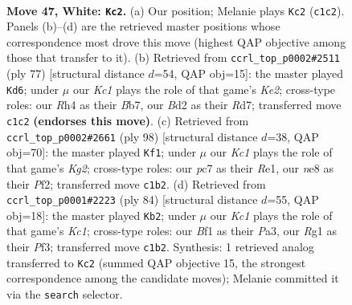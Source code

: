 \documentclass[11pt]{article}
\begin{document}
\clearpage

\begin{figure}[p]\centering
\begin{subfigure}{0.46\textwidth}\centering
\resizebox{\linewidth}{!}{%
\newchessgame
\chessboard[
  setfen={4n3/p1p5/2k2p2/8/r4P1R/8/3B3P/r1K2BR1 w - - 3 47},
  showmover=false,
  pgfstyle=straightmove, color=movearrow, markmove={c1-c2}
]}
\caption{}
\end{subfigure}\hfill
\begin{subfigure}{0.46\textwidth}\centering
\resizebox{\linewidth}{!}{%
\newchessgame
\chessboard[
  setfen={8/1b1rk2p/pp6/3p4/P4N2/1P1R2R1/2r2PP1/6K1 b - - 2 39},
  showmover=false,
  pgfstyle=straightmove, color=movearrow, markmove={e7-d6}
]}
\caption{}
\end{subfigure}
\\[4pt]
\begin{subfigure}{0.46\textwidth}\centering
\resizebox{\linewidth}{!}{%
\newchessgame
\chessboard[
  setfen={8/4k3/r2p4/P1pPn1p1/4B1r1/R7/5PK1/4R3 w - - 5 50},
  showmover=false,
  pgfstyle=straightmove, color=movearrow, markmove={g2-f1}
]}
\caption{}
\end{subfigure}\hfill
\begin{subfigure}{0.46\textwidth}\centering
\resizebox{\linewidth}{!}{%
\newchessgame
\chessboard[
  setfen={2r5/8/p3pk1P/1pr5/7R/P2B1P2/2P5/2K5 w - - 2 43},
  showmover=false,
  pgfstyle=straightmove, color=movearrow, markmove={c1-b2}
]}
\caption{}
\end{subfigure}
\caption{\textbf{Move 47, White: \texttt{Kc2}.} (a) Our position; Melanie plays \texttt{Kc2} (\texttt{c1c2}). Panels (b)--(d) are the retrieved master positions whose correspondence most drove this move (highest QAP objective among those that transfer to it). (b) Retrieved from \texttt{ccrl\_top\_p0002\#2511} (ply 77) [structural distance $d$=54, QAP obj=15]: the master played \texttt{Kd6}; under $\mu$ our \emph{Kc1} plays the role of that game's \emph{Ke2}; cross-type roles: our \emph{R}h4 as their \emph{B}b7, our \emph{B}d2 as their \emph{R}d7; transferred move \texttt{c1c2} \textbf{(endorses this move)}. (c) Retrieved from \texttt{ccrl\_top\_p0002\#2661} (ply 98) [structural distance $d$=38, QAP obj=70]: the master played \texttt{Kf1}; under $\mu$ our \emph{Kc1} plays the role of that game's \emph{Kg2}; cross-type roles: our \emph{p}c7 as their \emph{R}e1, our \emph{n}e8 as their \emph{P}f2; transferred move \texttt{c1b2}. (d) Retrieved from \texttt{ccrl\_top\_p0001\#2223} (ply 84) [structural distance $d$=55, QAP obj=18]: the master played \texttt{Kb2}; under $\mu$ our \emph{Kc1} plays the role of that game's \emph{Kc1}; cross-type roles: our \emph{B}f1 as their \emph{P}a3, our \emph{R}g1 as their \emph{P}f3; transferred move \texttt{c1b2}. Synthesis: 1 retrieved analog transferred to \texttt{Kc2} (summed QAP objective 15, the strongest correspondence among the candidate moves); Melanie committed it via the \texttt{search} selector.}
\label{fig:thought-m92}
\end{figure}
\end{document}

